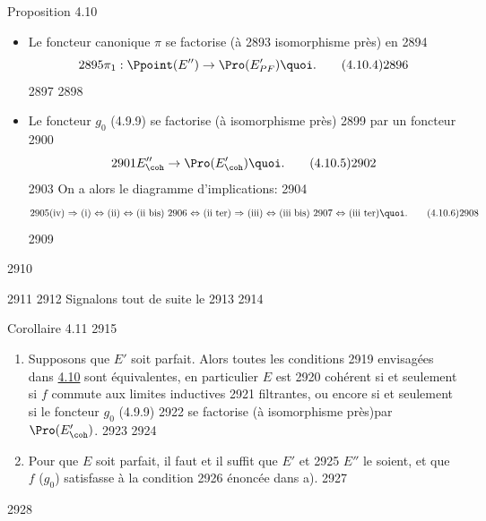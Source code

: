 \begin{enonce*}{Proposition 4.10}
\begin{itemize}
\begin{equation*}
  2887	E''_{\coh} \to \Pro(E'_{PF}){\quoi},\tag{4.10.3}
  2888	\end{equation*}
  2889	via le foncteur pleinement fidèle $\Pro(E'_{PF}) \to \Pro(E')$ déduit
  2890	de l'inclusion $E'_{PF} \to E'$.
  2891	
  2892	\item[(iii ter)] Le foncteur canonique $\pi$  se factorise (à
  2893	  isomorphisme près) en
  2894	\begin{equation*}
  2895	\pi_1 : \Ppoint(E'') \to \Pro(E'_{PF}){\quoi}.\tag{4.10.4}
  2896	\end{equation*}
  2897	
  2898	\item[(iv)] Le foncteur $g_0$ (4.9.9) se factorise (à isomorphisme près)
  2899	  par un foncteur
  2900	\begin{equation*}
  2901	E''_{\coh} \to \Pro(E'_{\coh}){\quoi}.\tag{4.10.5}
  2902	\end{equation*}
  2903	On a alors le diagramme d'implications:
  2904	\begin{equation*}
  2905	\text{\rm (iv) $\Rightarrow$ (i) $\Leftrightarrow$ (ii) $\Leftrightarrow$ (ii bis)
  2906	  $\Leftrightarrow$ (ii ter) $\Rightarrow$ (iii) $\Leftrightarrow$ (iii bis)
  2907	  $\Leftrightarrow$ (iii ter)}{\quoi}.\tag{4.10.6}
  2908	\end{equation*}
  2909	\end{itemize}
  2910	\end{enonce*}
  2911	
  2912	Signalons tout de suite le
  2913	
  2914	\begin{enonce*}{Corollaire 4.11}
  2915	\begin{enumerate}
  2916	\renewcommand{\theenumi}{\alph{enumi}}
  2917	\renewcommand{\labelenumi}{\theenumi)}
  2918	\item Supposons que $E'$ soit parfait. Alors toutes les conditions
  2919	  envisagées dans \hyperref[VI.prop4.10]{4.10} sont équivalentes, en particulier $E$ est
  2920	  cohérent si et seulement si $f$ commute aux limites inductives
  2921	  filtrantes, ou encore si et seulement si le foncteur $g_0$ (4.9.9)
  2922	  se factorise (à isomorphisme près)\pageoriginale par $\Pro(E'_{\coh})$.
  2923	
  2924	\item Pour que $E$ soit parfait, il faut et il suffit que $E'$ et
  2925	  $E''$ le soient, et que $f$ (\resp $g_0$) satisfasse à la condition
  2926	  énoncée dans {\rm a)}.
  2927	\end{enumerate}
  2928	\end{enonce*}
